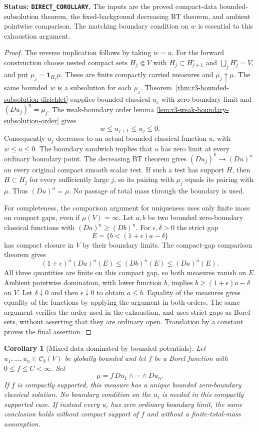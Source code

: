 \documentclass[11pt,a4paper]{article}
\numberwithin{equation}{section}
\newtheorem{corollary}[theorem]{Corollary}
\theoremstyle{definition}
\theoremstyle{remark}
\newcommand{\Cb}{\mathcal C_b}
\begin{document}
\noindent\textbf{Status: \texttt{DIRECT\_COROLLARY}.}
The inputs are the proved compact-data bounded-subsolution theorem,
the fixed-background decreasing BT theorem, and ambient pointwise
comparison. The matching boundary condition on $w$ is essential
to this exhaustion argument.

\begin{proof}
The reverse implication follows by taking $w=u$.
For the forward construction choose nested compact sets
$H_j\Subset V$ with $H_j\subset H_{j+1}^{\circ}$ and
$\bigcup_jH_j^{\circ}=V$, and put $\mu_j=\mathbf1_{H_j}\mu$.
These are finite compactly carried measures and $\mu_j\uparrow\mu$.
The same bounded $w$ is a subsolution for each $\mu_j$.
Theorem~\ref{thm:r3-bounded-subsolution-dirichlet} supplies bounded
classical $u_j$ with zero boundary limit and $(Du_j)^n=\mu_j$.
The weak-boundary order lemma
\ref{lem:r3-weak-boundary-subsolution-order} gives
\[
 w\leq u_{j+1}\leq u_j\leq0.
\]
Consequently $u_j$ decreases to an actual bounded classical
function $u$, with $w\leq u\leq0$. The boundary sandwich implies
that $u$ has zero limit at every ordinary boundary point. The
decreasing BT theorem gives $(Du_j)^n\to(Du)^n$ on every original
compact smooth scalar test. If such a test has support $H$, then
$H\subset H_j$ for every sufficiently large $j$, so its pairing
with $\mu_j$ equals its pairing with $\mu$. Thus $(Du)^n=\mu$.
No passage of total mass through the boundary is used.

For completeness, the comparison argument for uniqueness uses only
finite mass on compact gaps, even if $\mu(V)=\infty$.
Let $a,b$ be two bounded zero-boundary classical functions with
$(Da)^n\geq(Db)^n$. For $\epsilon,\delta>0$ the strict gap
\[
 E=\{b<(1+\epsilon)a-\delta\}
\]
has compact closure in $V$ by their boundary limits. The compact-gap
comparison theorem gives
\[
 (1+\epsilon)^n(Da)^n(E)\leq(Db)^n(E)\leq(Da)^n(E).
\]
All three quantities are finite on this compact gap, so both
measures vanish on $E$. Ambient pointwise domination, with lower
function $b$, implies $b\geq(1+\epsilon)a-\delta$ on $V$.
Let $\delta\downarrow0$ and then $\epsilon\downarrow0$ to obtain
$a\leq b$. Equality of the measures gives equality of the
functions by applying the argument in both orders. The same
argument verifies the order used in the exhaustion, and uses
strict gaps as Borel sets, without asserting that they are ordinary
open. Translation by a constant proves the final assertion.
\end{proof}

\begin{corollary}[Mixed data dominated by bounded potentials]
\label{cor:r3-mixed-datum-dirichlet}
Let $u_1,\ldots,u_n\in\Cb(V)$ be globally bounded and let
$f$ be a Borel function with $0\leq f\leq C<\infty$. Set
\[
 \mu=f\,Du_1\wedge\cdots\wedge Du_n.
\]
If $f$ is compactly supported, this measure has a unique bounded
zero-boundary classical solution. No boundary condition on the
$u_i$ is needed in this compactly supported case. If instead every
$u_i$ has zero ordinary boundary limit, the same conclusion holds
without compact support of $f$ and without a finite-total-mass
assumption.
\end{corollary}
\end{document}
